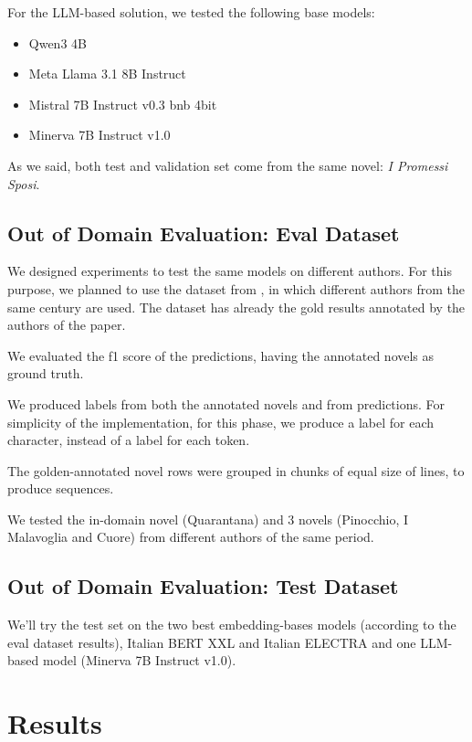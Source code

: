 \documentclass[11pt]{article}
\begin{document}
For the LLM-based solution, we tested the following base models:

 \begin{itemize}
 	\item Qwen3 4B
	\item Meta Llama 3.1 8B Instruct
	\item Mistral 7B Instruct v0.3 bnb 4bit
	\item Minerva 7B Instruct v1.0
\end{itemize}

As we said, both test and validation set come from the same novel: \emph{I Promessi Sposi}. 

\subsection{Out of Domain Evaluation: Eval Dataset}

We designed experiments to test the same models on different authors.
For this purpose, we planned to use the dataset from \cite{redaelli-sprugnoli-2024-sentence}, in which different authors
from the same century are used.
The dataset has already the gold results annotated by the authors of the paper.

We evaluated the f1 score of the predictions, having the annotated
novels as ground truth.

We produced labels from both the annotated novels and 
from predictions. For simplicity of the implementation,
for this phase, we produce a label for each character, instead of a label for each token.

The golden-annotated novel rows were grouped in chunks of equal size of lines, to produce sequences.

We tested the in-domain novel (Quarantana) and 3 novels (Pinocchio, I Malavoglia and Cuore) from different authors of the same period.

\subsection{Out of Domain Evaluation: Test Dataset}

We'll try the test set on the two best embedding-bases models
(according to the eval dataset results), Italian BERT XXL and Italian ELECTRA and
one LLM-based model (Minerva 7B Instruct v1.0).

\section{Results}
\end{document}
